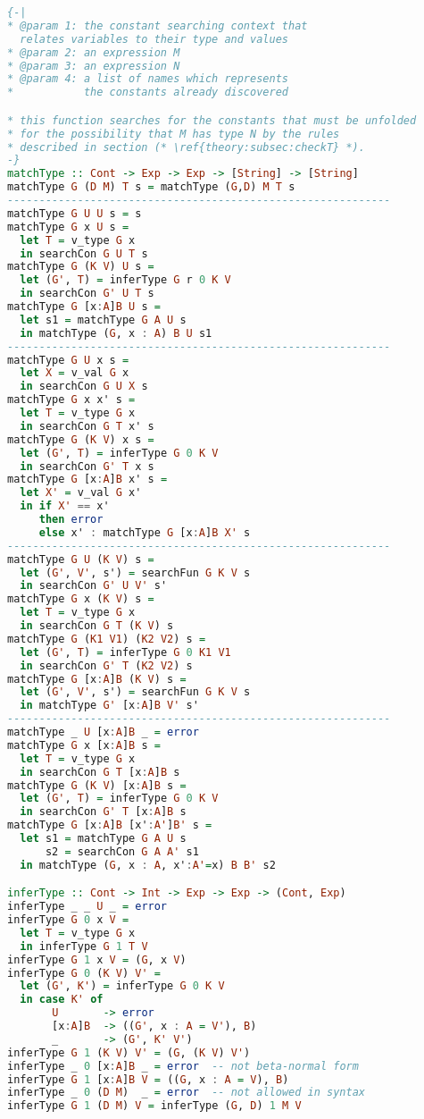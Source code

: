 \begin{lstlisting}[language=Haskell, caption={Approximation Algorithm For Minimum Set of Constants}, label={theory:alg:minimum}]
{-|
* @param 1: the constant searching context that
  relates variables to their type and values
* @param 2: an expression M
* @param 3: an expression N
* @param 4: a list of names which represents
*           the constants already discovered

* this function searches for the constants that must be unfolded
* for the possibility that M has type N by the rules
* described in section (* \ref{theory:subsec:checkT} *).
-}
matchType :: Cont -> Exp -> Exp -> [String] -> [String]
matchType G (D M) T s = matchType (G,D) M T s
------------------------------------------------------------
matchType G U U s = s 
matchType G x U s = 
  let T = v_type G x
  in searchCon G U T s
matchType G (K V) U s =
  let (G', T) = inferType G r 0 K V
  in searchCon G' U T s 
matchType G [x:A]B U s =
  let s1 = matchType G A U s
  in matchType (G, x : A) B U s1
------------------------------------------------------------
matchType G U x s = 
  let X = v_val G x
  in searchCon G U X s
matchType G x x' s =
  let T = v_type G x 
  in searchCon G T x' s
matchType G (K V) x s = 
  let (G', T) = inferType G 0 K V
  in searchCon G' T x s
matchType G [x:A]B x' s =
  let X' = v_val G x'
  in if X' == x'
     then error 
     else x' : matchType G [x:A]B X' s
------------------------------------------------------------
matchType G U (K V) s = 
  let (G', V', s') = searchFun G K V s
  in searchCon G' U V' s'
matchType G x (K V) s = 
  let T = v_type G x 
  in searchCon G T (K V) s
matchType G (K1 V1) (K2 V2) s =
  let (G', T) = inferType G 0 K1 V1
  in searchCon G' T (K2 V2) s
matchType G [x:A]B (K V) s = 
  let (G', V', s') = searchFun G K V s
  in matchType G' [x:A]B V' s'
------------------------------------------------------------
matchType _ U [x:A]B _ = error
matchType G x [x:A]B s = 
  let T = v_type G x 
  in searchCon G T [x:A]B s
matchType G (K V) [x:A]B s = 
  let (G', T) = inferType G 0 K V
  in searchCon G' T [x:A]B s
matchType G [x:A]B [x':A']B' s =
  let s1 = matchType G A U s
      s2 = searchCon G A A' s1
  in matchType (G, x : A, x':A'=x) B B' s2

inferType :: Cont -> Int -> Exp -> Exp -> (Cont, Exp)
inferType _ _ U _ = error
inferType G 0 x V =
  let T = v_type G x
  in inferType G 1 T V
inferType G 1 x V = (G, x V) 
inferType G 0 (K V) V' = 
  let (G', K') = inferType G 0 K V
  in case K' of
       U       -> error
       [x:A]B  -> ((G', x : A = V'), B) 
       _       -> (G', K' V')
inferType G 1 (K V) V' = (G, (K V) V')
inferType _ 0 [x:A]B _ = error  -- not beta-normal form
inferType G 1 [x:A]B V = ((G, x : A = V), B)
inferType _ 0 (D M)  _ = error  -- not allowed in syntax
inferType G 1 (D M) V = inferType (G, D) 1 M V


\end{lstlisting}
